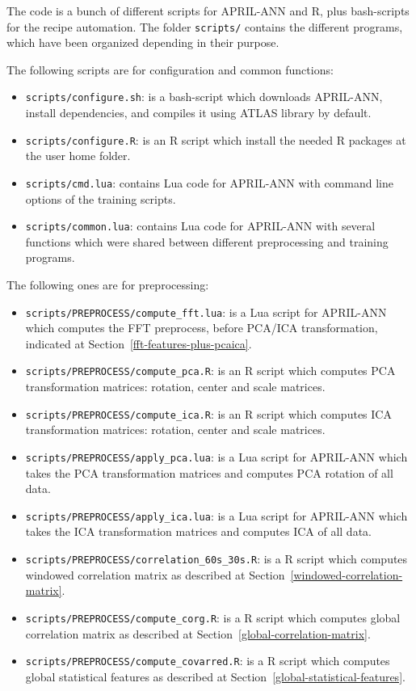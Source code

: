 \documentclass[a4paper,english,twoside]{article}
\begin{document}
The code is a bunch of different scripts for APRIL-ANN and R, plus bash-scripts
for the recipe automation. The folder \verb+scripts/+ contains the different
programs, which have been organized depending in their purpose.

The following scripts are for configuration and common functions:

\begin{itemize}
\item \verb+scripts/configure.sh+: is a bash-script which downloads APRIL-ANN,
  install dependencies, and compiles it using ATLAS library by default.
\item \verb+scripts/configure.R+: is an R script which install the needed
  R packages at the user home folder.
\item \verb+scripts/cmd.lua+: contains Lua code for APRIL-ANN with command
  line options of the training scripts.
\item \verb+scripts/common.lua+: contains Lua code for APRIL-ANN with several
  functions which were shared between different preprocessing and training
  programs.
\end{itemize}

The following ones are for preprocessing:

\begin{itemize}
\item \verb+scripts/PREPROCESS/compute_fft.lua+: is a Lua script for APRIL-ANN
  which computes the FFT preprocess, before PCA/ICA transformation, indicated at
  Section~\ref{fft-features-plus-pcaica}.
\item \verb+scripts/PREPROCESS/compute_pca.R+: is an R script which computes
  PCA transformation matrices: rotation, center and scale matrices.
\item \verb+scripts/PREPROCESS/compute_ica.R+: is an R script which computes ICA
  transformation matrices: rotation, center and scale matrices.
\item \verb+scripts/PREPROCESS/apply_pca.lua+: is a Lua script for APRIL-ANN
  which takes the PCA transformation matrices and computes PCA rotation of all
  data.
\item \verb+scripts/PREPROCESS/apply_ica.lua+: is a Lua script for APRIL-ANN
  which takes the ICA transformation matrices and computes ICA of all data.
\item \verb+scripts/PREPROCESS/correlation_60s_30s.R+: is a R script which
  computes windowed correlation matrix as described at
  Section~\ref{windowed-correlation-matrix}.
\item \verb+scripts/PREPROCESS/compute_corg.R+: is a R script which computes
  global correlation matrix as described at
  Section~\ref{global-correlation-matrix}.
\item \verb+scripts/PREPROCESS/compute_covarred.R+: is a R script which computes
  global statistical features as described at
  Section~\ref{global-statistical-features}.
\end{itemize}
\end{document}
